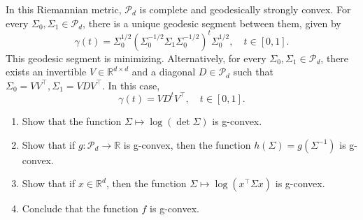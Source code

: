 \documentclass[en, oneside]{assignment}
\begin{document}
\begin{prob}
    In this Riemannian metric, $\mathcal P_d$ is complete and geodesically strongly convex. 
    For every $\Sigma_0, \Sigma_1 \in \mathcal P_d$, there is a unique geodesic segment between them, given by
    \begin{equation*}
        \gamma(t) = \Sigma_0^{1/2} (\Sigma_0^{-1/2} \Sigma_1 \Sigma_0^{-1/2})^t \Sigma_0^{1/2}, \quad t \in [0, 1].
    \end{equation*}
    This geodesic segment is minimizing. Alternatively, for every $\Sigma_0, \Sigma_1 \in \mathcal P_d$, 
    there exists an invertible $V \in \mathbb R^{d \times d}$ and a diagonal $D \in \mathcal P_d$ such that $\Sigma_0 = V V^\top, \Sigma_1 = V D V^\top$. In this case, 
    \begin{equation*}
        \gamma(t) = V D^t V^\top, \quad t \in [0, 1].
    \end{equation*}
    \begin{enumerate}[label=(\arabic*)]
        \item Show that the function $\Sigma \mapsto \log (\det \Sigma)$ is g-convex.
        \item Show that if $g: \mathcal P_d \rightarrow \mathbb R$ is g-convex, then the function $h(\Sigma) = g(\Sigma^{-1})$ is g-convex.
        \item Show that if $x \in \mathbb R^d$, then the function $\Sigma \mapsto \log (x^\top \Sigma x)$ is g-convex.
        \item Conclude that the function $f$ is g-convex.
    \end{enumerate}
\end{prob}
\end{document}
